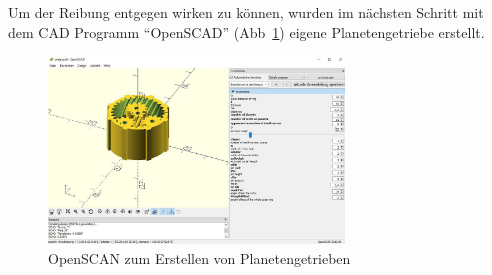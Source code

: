 Um der Reibung entgegen wirken zu können, wurden im nächsten Schritt mit dem CAD Programm ``OpenSCAD'' (Abb~\ref{bild:gearversion2}) eigene Planetengetriebe erstellt.

\begin{figure}[!ht]
	\centering
	\includegraphics[width=0.7\textwidth]{bilder/GetriebeVersion2.jpg}
	\caption{OpenSCAN zum Erstellen von Planetengetrieben}
	\label{bild:gearversion2}
\end{figure}

